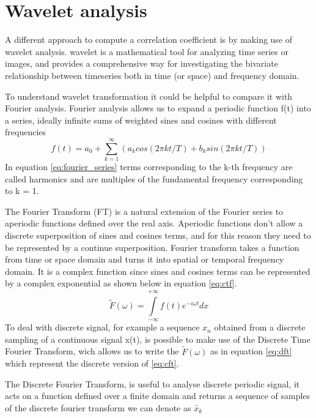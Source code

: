 \documentclass[11pt]{report}
\begin{document}
\section{Wavelet analysis}
A different approach to compute a correlation coefficient is by making use of wavelet analysis.\cite{ferrante-2015} \cite{vandenberg-1999}
wavelet is a mathematical tool for analyzing time series or images, and provides a comprehensive way for investigating the bivariate relationship between timeseries both in time (or space) and frequency domain.

To understand wavelet transformation it could be helpful to compare it with Fourier analysis.
Fourier analysis allows us to expand a periodic function f(t) into a series, ideally infinite sums of weighted sines and cosines with different frequencies
\begin{equation}\label{eq:fourier_series}
f(t) = a_0 + \sum_{k = 1}^\infty (a_k cos(2\pi k t/T) + b_k sin (2\pi k t /T))
\end{equation}
In equation \ref{eq:fourier_series} terms corresponding to the k-th frequency are called harmonics and are multiples of the fundamental frequency corresponding to k = 1.

The Fourier Transform (FT) is a natural extension of the Fourier series to aperiodic functions defined over the real axis.
Aperiodic functions don't allow a discrete superposition of sines and cosines terms, and for this reason they need to be represented by a continue superposition.
Fourier transform takes a function from time or space domain and turns it into spatial or temporal frequency domain.
It is a complex function since sines and cosines terms can be represented by a complex exponential as shown below in equation \ref{eq:ctf}.
\begin{equation}\label{eq:cft}
\tilde{F}(\omega) = \int\limits_{-\infty}^{+\infty} f(t)e^{-i \omega t} dx
\end{equation}
To deal with discrete signal, for example a sequence $x_n$ obtained from a discrete sampling of a continuous signal x(t), is possible to make use of the Discrete Time Fourier Transform, wich allows us to write the $\tilde F(\omega)$ as in equation \ref{eq:dft} which represent the discrete version of \ref{eq:cft}.

The Discrete Fourier Transform, is useful to analyse discrete periodic signal, it acts on a function defined over a finite domain and returns a sequence of samples of the discrete fourier transform we can denote as $\tilde{x_k}$
\end{document}
